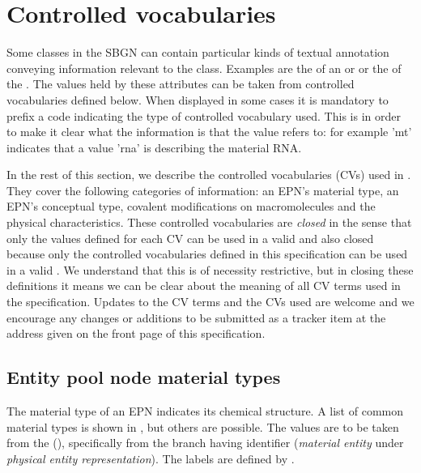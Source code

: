 \section{Controlled vocabularies}\label{sec:techref:CVs}


Some classes in the SBGN \PDl can contain particular kinds of textual
annotation conveying information relevant to the class.  Examples are
the  of an  or
 or the  of the
. The values held by these attributes can be
taken from controlled vocabularies defined below. When displayed in
some cases it is mandatory to prefix a code indicating the type of
controlled vocabulary used.  This is in order to make it clear what
the information is that the value refers to: for example 'mt'
indicates that a value 'rna' is describing the material RNA.

In the rest of this section, we describe the controlled vocabularies
(CVs) used in \SBGNPDLone.  They cover the following categories of
information: an EPN's material type, an EPN's conceptual type,
covalent modifications on macromolecules and the physical
characteristics. These controlled vocabularies are \emph{closed} in
the sense that only the values defined for each CV can be used in a
valid \PDm and also closed because only the controlled vocabularies
defined in this specification can be used in a valid \PDm{}. We
understand that this is of necessity restrictive, but in closing these
definitions it means we can be clear about the meaning of all CV terms
used in the specification. Updates to the CV terms and the CVs used
are welcome and we encourage any changes or additions to be submitted
as a tracker item at the address given on the front page of this
specification.


\subsection{Entity pool node material types}
\label{sec:techref:material-types-cv}

The material type of an EPN indicates its chemical structure.  A list
of common material types is shown in , but
others are possible.  The values are to be taken from the \sbo
(\sbourl), specifically from the branch having identifier
 ($\!$\emph{material entity} under \emph{physical entity representation}).
The labels are defined by \SBGNPDLone.

